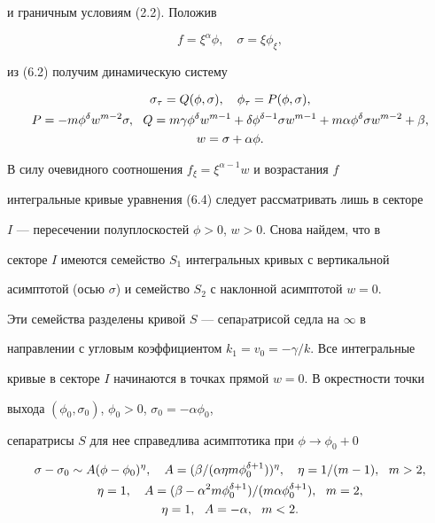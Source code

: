 и граничным условиям (2.2). Положив 


\begin{equation} 


f=\xi^\alpha\phi,\quad \sigma=\xi \phi_\xi, 


\end{equation} 


из (6.2) получим динамическую систему 


\begin{gather} 


\sigma_\tau=Q(\phi,\sigma),\quad \phi_\tau=P(\phi,\sigma),\\ 


P=-m\phi^\delta w^{m-2}\sigma,\ \ Q=m\gamma\phi^\delta w^{m-1}+ 


\delta\phi^{\delta-1}\sigma w^{m-1}+m\alpha\phi^\delta\sigma 


w^{m-2}+\beta,\notag\\ 


w=\sigma+\alpha\phi.\notag 


\end{gather} 


 


В силу очевидного соотношения $f_\xi=\xi^{\alpha-1}w$ и возрастания $f$ 


интегральные кривые уравнения (6.4) следует рассматривать лишь в секторе 


$I$ --- пересечении полуплоскостей $\phi>0$, $w>0$. Снова найдем, что в 


секторе $I$ имеются семейство $S_1$ интегральных кривых с вертикальной 


асимптотой (осью $\sigma$) и семейство $S_2$ с наклонной асимптотой $w=0$. 


Эти семейства разделены кривой $S$ --- сепаpатрисой седла на $\infty$ в 


направлении с угловым коэффициентом $k_1=v_0=-\gamma/k$. Все интегральные 


кривые в секторе $I$ начинаются в точках прямой $w=0$. В окрестности точки 


выхода $(\phi_0,\sigma_0)$, $\phi_0>0$, $\sigma_0=-\alpha\phi_0$, 


сепаратрисы $S$ для нее справедлива асимптотика при $\phi\to\phi_0+0$ 


\begin{gather} 


\sigma-\sigma_0\sim A(\phi-\phi_0)^\eta,\quad 


A=(\beta/(\alpha\eta m\phi_0^{\delta+1}))^\eta,\quad 


\eta=1/(m-1),\ \ m>2,\\ 


\eta=1,\quad A=(\beta-\alpha^2m\phi_0^{\delta+1})/ 


(m\alpha\phi_0^{\delta+1}),\ \ m=2,\notag \\ 


\eta=1,\ \ A=-\alpha,\ \ m<2.\notag 


\end{gather} 


